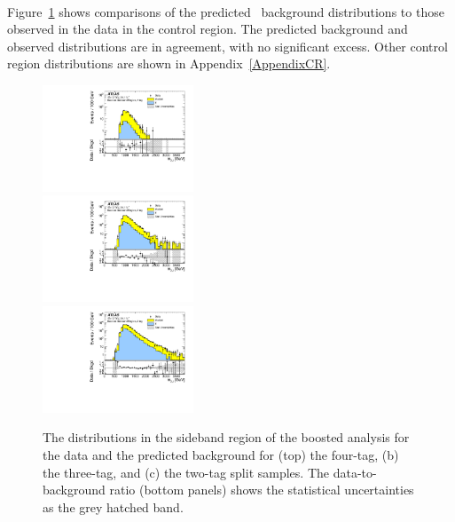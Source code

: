 \paragraph{}
Figure~\ref{fig:boosted-cr-mjj} shows comparisons of the predicted \mtwoJ~background distributions to those observed in the data in the control region.
The predicted background and observed distributions are in agreement, with no significant excess.
Other control region distributions are shown in Appendix~\ref{AppendixCR}.

\begin{figure}[htbp!]
\begin{center}
 \includegraphics[width=0.4\textwidth,angle=-90]{figures/boosted/Paperplot/Moriond_bkg_9_FourTag_Sideband_mHH_l_1.pdf}\\
 \includegraphics[width=0.4\textwidth,angle=-90]{figures/boosted/Paperplot/Moriond_bkg_9_ThreeTag_Sideband_mHH_l_1.pdf}\\
 \includegraphics[width=0.4\textwidth,angle=-90]{figures/boosted/Paperplot/Moriond_bkg_9_TwoTag_split_Sideband_mHH_l_1.pdf}\\
\caption{The \mtwoJ distributions in the sideband region of the boosted analysis for the data and the predicted background for (top) the four-tag, (b) the three-tag, and (c) the two-tag split samples. The data-to-background ratio (bottom panels) shows the statistical uncertainties as the grey hatched band.}
\label{fig:boosted-cr-mjj}
\end{center}
\end{figure}
